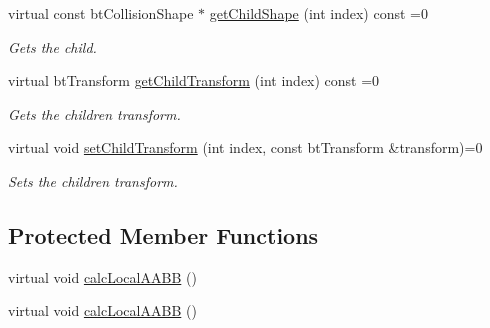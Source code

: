 \begin{DoxyCompactItemize}
\mbox{\label{classbtGImpactShapeInterface_a0f89806a197c690e295ba0f60559b015}} 
virtual const bt\+Collision\+Shape $\ast$ \hyperlink{classbtGImpactShapeInterface_a0f89806a197c690e295ba0f60559b015}{get\+Child\+Shape} (int index) const =0
\begin{DoxyCompactList}\small\item\em Gets the child. \end{DoxyCompactList}\item 
\mbox{\label{classbtGImpactShapeInterface_ac06b1f597e2b628bf1e0523ab1c62d08}} 
virtual bt\+Transform \hyperlink{classbtGImpactShapeInterface_ac06b1f597e2b628bf1e0523ab1c62d08}{get\+Child\+Transform} (int index) const =0
\begin{DoxyCompactList}\small\item\em Gets the children transform. \end{DoxyCompactList}\item 
virtual void \hyperlink{classbtGImpactShapeInterface_a83392f97bd7dfeb71ccdce6913a465b0}{set\+Child\+Transform} (int index, const bt\+Transform \&transform)=0
\begin{DoxyCompactList}\small\item\em Sets the children transform. \end{DoxyCompactList}\end{DoxyCompactItemize}

\subsection*{Protected Member Functions}
\begin{DoxyCompactItemize}
\item 
virtual void \hyperlink{classbtGImpactShapeInterface_a1712a4613e20aa9249514dcd97f0a086}{calc\+Local\+A\+A\+BB} ()
\item 
virtual void \hyperlink{classbtGImpactShapeInterface_a1712a4613e20aa9249514dcd97f0a086}{calc\+Local\+A\+A\+BB} ()
\end{DoxyCompactItemize}
